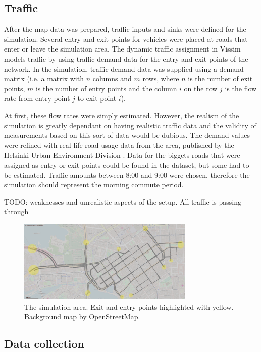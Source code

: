\documentclass[english, 12pt, a4paper, elec, utf8, pdfa, online]{aaltothesis}
\begin{document}
\subsection{Traffic}

After the map data was prepared, traffic inputs and sinks were defined for the simulation. Several entry and exit points for vehicles were placed at roads that enter or leave the simulation area. The dynamic traffic assignment in Vissim models traffic by using traffic demand data for the entry and exit points of the network. In the simulation, traffic demand data was supplied using a demand matrix (i.e. a matrix with $n$ columns and $m$ rows, where $n$ is the number of exit points, $m$ is the number of entry points and the column $i$ on the row $j$ is the flow rate from entry point $j$ to exit point $i$).

At first, these flow rates were simply estimated. However, the realism of the simulation is greatly dependant on having realistic traffic data and the validity of measurements based on this sort of data would be dubious. The demand values were refined with real-life road usage data from the area, published by the Helsinki Urban Environment Division \cite{trafficamounts}. Data for the biggets roads that were assigned as entry or exit points could be found in the dataset, but some had to be estimated. Traffic amounts between 8:00 and 9:00 were chosen, therefore the simulation should represent the morning commute period.

TODO: weaknesses and unrealistic aspects of the setup. All traffic is passing through

\begin{figure}[h]
    \centering
    \includegraphics[width=0.75\textwidth]{graphs/vissim_map_entries}
    \caption{The simulation area. Exit and entry points highlighted with yellow. Background map by OpenStreetMap\cite{osm}.}
\end{figure}

\subsection{Data collection}
\end{document}
